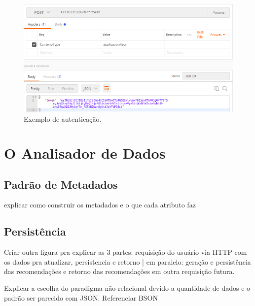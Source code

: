 \documentclass[12pt, openright, oneside, a4paper, brazil]{abntex2}
\begin{document}
\begin{figure}[h!tp]

	\caption{\label{auth_example}Exemplo de autenticação.}

	\begin{center}
		\includegraphics[scale=0.6]{images/auth_example.png}

	\end{center}

	\hspace{5.5cm}{Fonte: O Autor.}

\end{figure}

\section{O Analisador de Dados} \label{analisador}

\subsection{Padrão de Metadados} \label{analisador:padrao_metadados}

explicar como construir os metadados e o que cada atributo faz

\subsection{Persistência} \label{analisador:persistencia}

Criar outra figura pra explicar as 3 partes: requisição do usuário via HTTP com os dados pra atualizar, persistencia e retorno | em paralelo: geração e persistência das recomendações e retorno das recomendações em outra requisição futura.

Explicar a escolha do paradigma não relacional devido a quantidade de dados e o padrão ser parecido com JSON. Referenciar BSON
\end{document}
